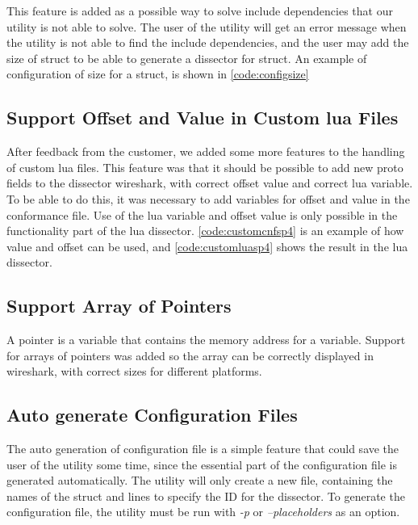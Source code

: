This feature is added as a possible way to solve include dependencies that our 
\gls{utility} is not able to solve. The user of the \gls{utility} will get an error 
message when the \gls{utility} is not able to find the include dependencies, and the 
user may add the size of \gls{struct} to be able to generate a \gls{dissector} for \gls{struct}. 
An example of configuration of size for a \gls{struct}, is shown in 
\autoref{code:configsize}



\subsection{Support Offset and Value in Custom \Gls{lua} Files}
After feedback from the customer, we added some more features to 
the handling of custom \Gls{lua} files. This feature was that it should be possible 
to add new proto fields to the \gls{dissector} \Gls{wireshark}, with correct offset value 
and correct \Gls{lua} variable. To be able to do this, it was necessary to add
variables for offset and value in the conformance file. Use of the \Gls{lua} 
variable and offset value is only possible in the functionality part of the 
\Gls{lua} \gls{dissector}. \autoref{code:customcnfsp4} is an example of how value and 
offset can be used, and \autoref{code:customluasp4} shows the result in the \Gls{lua} 
\gls{dissector}.





\subsection{Support Array of Pointers}
A pointer is a variable that contains the memory address for a variable. 
Support for arrays of pointers was added so the array can be correctly 
displayed in \Gls{wireshark}, with correct sizes for different platforms.

\subsection{Auto generate Configuration Files}
The auto generation of configuration file is a simple feature that could save 
the user of the \gls{utility} some time, since the essential part of the 
configuration file is generated automatically. The \gls{utility} will only create a new 
file, containing the names of the \gls{struct} and lines to specify the ID for the 
\gls{dissector}. To generate the configuration file, the \gls{utility} must be run with 
\emph{-p} or \emph{--placeholders} as an option.

